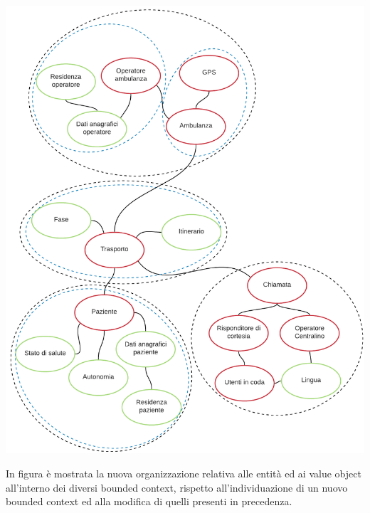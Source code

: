 \documentclass[12pt]{article}
\begin{document}
\centerline{\includegraphics[width=15cm]{fig/BoundedContext2.png}}

In figura è mostrata la nuova organizzazione relativa alle entità ed ai value object all'interno dei diversi bounded context, rispetto all'individuazione di un nuovo bounded context ed alla modifica di quelli presenti in precedenza. 
\end{document}
